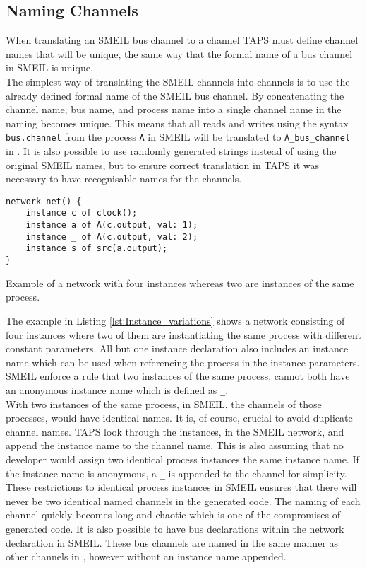 \subsection{Naming Channels}
When translating an SMEIL bus channel to a \cspm{} channel TAPS must define \cspm{} channel names that will be unique, the same way that the formal name of a bus channel in SMEIL is unique.\\

The simplest way of translating the SMEIL channels into \cspm{} channels is to use the already defined formal name of the SMEIL bus channel. By concatenating the channel name, bus name, and process name into a single channel name in \cspm{} the naming becomes unique.
This means that all reads and writes using the syntax \texttt{bus.channel} from the process \texttt{A} in SMEIL will be translated to \texttt{A\_bus\_channel} in \cspm{}.
It is also possible to use randomly generated strings instead of using the original SMEIL names, but to ensure correct translation in TAPS it was necessary to have recognisable names for the \cspm channels.
\begin{listing}
\begin{verbatim}
network net() {
    instance c of clock();
    instance a of A(c.output, val: 1);
    instance _ of A(c.output, val: 2);
    instance s of src(a.output);
}
\end{verbatim}
\caption{Example of a network with four instances whereas two are instances of the same process.}
\label{lst:Instance_variations}
\end{listing}
The example in Listing \ref{lst:Instance_variations} shows a network consisting of four instances where two of them are instantiating the same process with different constant parameters. All but one instance declaration also includes an instance name which can be used when referencing the process in the instance parameters. SMEIL enforce a rule that two instances of the same process, cannot both have an anonymous instance name which is defined as \texttt{\_}.\\

With two instances of the same process, in SMEIL, the \cspm{} channels of those processes, would have identical names. It is, of course, crucial to avoid duplicate channel names. TAPS look through the instances, in the SMEIL network, and append the instance name to the \cspm{} channel name. This is also assuming that no developer would assign two identical process instances the same instance name. If the instance name is anonymous, a \texttt{\_} is appended to the \cspm{} channel for simplicity. These restrictions to identical process instances in SMEIL ensures that there will never be two identical named \cspm{} channels in the generated code. The naming of each channel quickly becomes long and chaotic which is one of the compromises of generated code. It is also possible to have bus declarations within the network declaration in SMEIL. These bus channels are named in the same manner as other channels in \cspm{}, however without an instance name appended.

